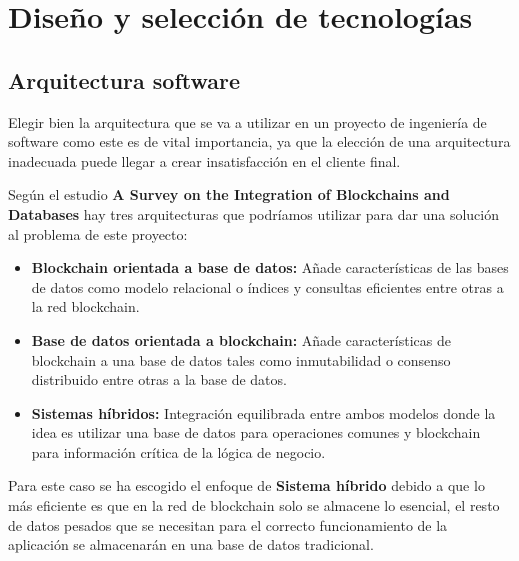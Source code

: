 \raggedbottom
\chapter{Diseño y selección de tecnologías}
\section{Arquitectura software}
Elegir bien la arquitectura que se va a utilizar en un proyecto de ingeniería de software como este es de vital importancia, ya que la elección de una arquitectura inadecuada puede llegar a crear insatisfacción en el cliente final.

Según el estudio \textbf{A Survey on the Integration of Blockchains and Databases} hay tres arquitecturas que podríamos utilizar para dar una solución al problema de este proyecto:
\begin{itemize}
    \item \textbf{Blockchain orientada a base de datos:} Añade características de las bases de datos como  modelo relacional o índices y consultas eficientes entre otras a la red blockchain.
    \item \textbf{Base de datos orientada a blockchain:} Añade características de blockchain a una base de datos tales como inmutabilidad o consenso distribuido entre otras a la base de datos.
    \item \textbf{Sistemas híbridos:} Integración equilibrada entre ambos modelos donde la idea es utilizar una base de datos para operaciones comunes y blockchain para información crítica de la lógica de negocio.
\end{itemize}

Para este caso se ha escogido el enfoque de \textbf{Sistema híbrido} debido a que lo más eficiente es que en la red de blockchain solo se almacene lo esencial, el resto de datos pesados que se necesitan para el correcto funcionamiento de la aplicación se almacenarán en una base de datos tradicional.\\

